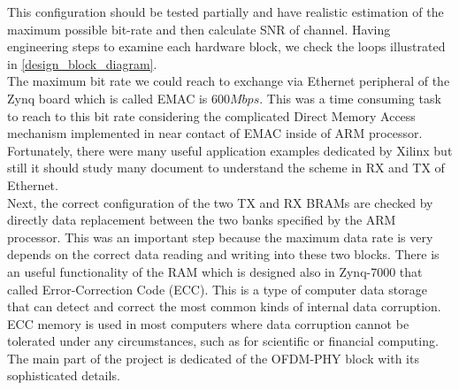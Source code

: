 This configuration should be tested partially and have realistic estimation of the maximum possible bit-rate and then calculate SNR of channel. Having engineering steps to examine each hardware block, we check the loops illustrated in \ref{design_block_diagram}.\\
The maximum bit rate we could reach to exchange via Ethernet peripheral of the Zynq board which is called EMAC is $600 Mbps$. This was a time consuming task to reach to this bit rate considering the complicated Direct Memory Access mechanism implemented in near contact of EMAC inside of ARM processor. Fortunately, there were many useful application examples dedicated by Xilinx but still it should study many document to understand the scheme in RX and TX of Ethernet.\\
Next, the correct configuration of the two TX and RX BRAMs are checked by directly data replacement between the two banks specified by the ARM processor. This was an important step because the maximum data rate is very depends on the correct data reading and writing into these two blocks. There is an useful functionality of the RAM which is designed also in Zynq-7000 that called Error-Correction Code (ECC). This is a type of computer data storage that can detect and correct the most common kinds of internal data corruption. ECC memory is used in most computers where data corruption cannot be tolerated under any circumstances, such as for scientific or financial computing.\\
The main part of the project is dedicated of the OFDM-PHY block with its sophisticated details.\\
